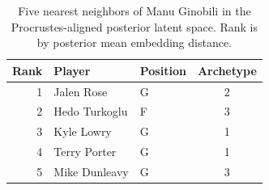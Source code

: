 \begin{table}[htbp]
  \centering\small
  \begin{tabular}{rllc}
    \toprule
    Rank & Player & Position & Archetype \\
    \midrule
    1 & Jalen Rose & G & 2 \\
    2 & Hedo Turkoglu & F & 3 \\
    3 & Kyle Lowry & G & 1 \\
    4 & Terry Porter & G & 1 \\
    5 & Mike Dunleavy & G & 3 \\
    \bottomrule
  \end{tabular}
  \caption{Five nearest neighbors of Manu Ginobili in the Procrustes-aligned posterior latent space. Rank is by posterior mean embedding distance.}
  \label{tab:Manu_Ginobili_neighbors}
\end{table}

